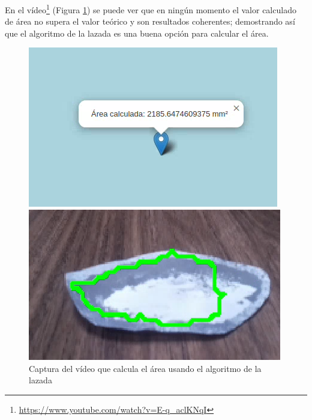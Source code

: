En el vídeo\footnote{\url{https://www.youtube.com/watch?v=E-q_aclKNqI}} (Figura \ref{fig:expcapturalazada}) se puede ver que en ningún momento el valor calculado de área no supera el valor teórico y son resultados coherentes; demostrando así que el algoritmo de la lazada es una buena opción para calcular el área.
 

\begin{figure}[ht!]
	\centering
	\begin{minipage}{0.40\linewidth}
		\centering
		\includegraphics[width=\linewidth]{figs/cap7/capturavideolazada1.png}
	\end{minipage}
	\hspace{1cm}
	\begin{minipage}{0.40\linewidth}
		\centering
		\includegraphics[width=\linewidth]{figs/cap7/capturavideolazada2.png}
	\end{minipage}
	\caption{Captura del vídeo que calcula el área usando el algoritmo de la lazada}
	\label{fig:expcapturalazada}
\end{figure}


